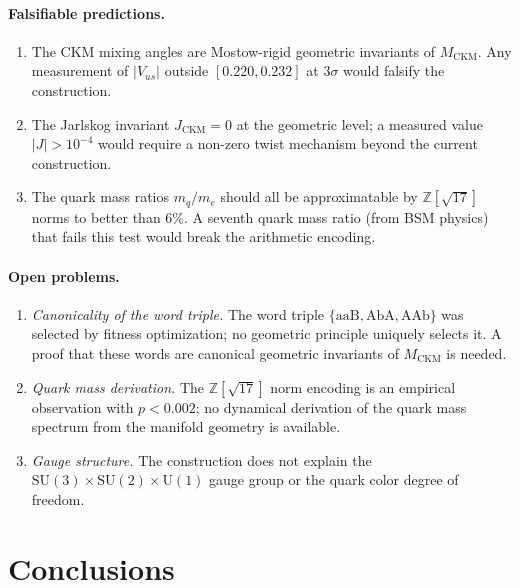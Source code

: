 \documentclass[11pt,a4paper]{article}
\theoremstyle{definition}
\theoremstyle{remark}
\newcommand{\MCKM}{M_{\mathrm{CKM}}}
\newcommand{\Zsev}{\mathbb{Z}[\sqrt{17}]}
\begin{document}
\paragraph{Falsifiable predictions.}
\begin{enumerate}
\item The CKM mixing angles are Mostow-rigid geometric invariants of
  $\MCKM$. Any measurement of $|V_{us}|$ outside $[0.220,0.232]$
  at $3\sigma$ would falsify the construction.
\item The Jarlskog invariant $J_{\mathrm{CKM}}=0$ at the geometric
  level; a measured value $|J|>10^{-4}$ would require a non-zero
  twist mechanism beyond the current construction.
\item The quark mass ratios $m_q/m_e$ should all be approximatable
  by $\Zsev$ norms to better than $6\%$. A seventh quark mass
  ratio (from BSM physics) that fails this test would break the
  arithmetic encoding.
\end{enumerate}

\paragraph{Open problems.}
\begin{enumerate}
\item \emph{Canonicality of the word triple.} The word triple
  $\{\mathrm{aaB},\mathrm{AbA},\mathrm{AAb}\}$ was selected by
  fitness optimization; no geometric principle uniquely selects it.
  A proof that these words are canonical geometric invariants of
  $\MCKM$ is needed.
\item \emph{Quark mass derivation.} The $\Zsev$ norm encoding is an
  empirical observation with $p<0.002$; no dynamical derivation
  of the quark mass spectrum from the manifold geometry is available.
\item \emph{Gauge structure.} The construction does not explain the
  $\mathrm{SU}(3)\times\mathrm{SU}(2)\times\mathrm{U}(1)$ gauge
  group or the quark color degree of freedom.
\end{enumerate}

\section{Conclusions}
\label{sec:conclusions}
\end{document}
